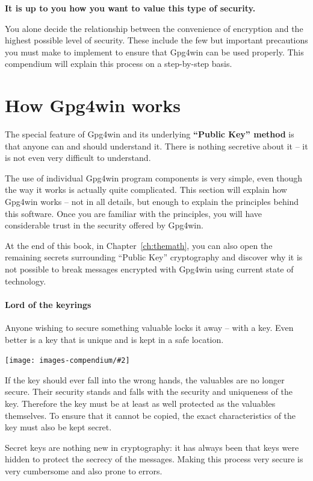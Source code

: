 \documentclass[a4paper,11pt,oneside,openright,titlepage]{scrbook}
\newcommand{\IncludeImage}[2][]{
\begin{center}
  \texttt{[image: images-compendium/\#2]}%
\end{center}
}
\begin{document}
\textbf{It is up to you how you want to value this type of security.}

You alone decide the relationship between the convenience of encryption
and the highest possible level of security. These include the few but
important precautions you must make to implement to ensure that
Gpg4win can be used properly. This compendium will explain this
process on a step-by-step basis.


\clearpage
\chapter{How Gpg4win works}
\label{ch:FunctionOfGpg4win}
The special feature of Gpg4win and its underlying
\textbf{``Public Key'' method}
is that anyone can and should understand it. There is nothing
secretive about it -- it is not even very difficult to understand.

The use of individual Gpg4win program components is very simple, even
though the way it works is actually quite complicated. This section
will explain how Gpg4win works -- not in all details, but enough to
explain the principles behind this software. Once you are familiar
with the principles, you will have considerable trust in the security
offered by Gpg4win.

At the end of this book, in Chapter~\ref{ch:themath}, you can also open
the remaining secrets surrounding ``Public Key'' cryptography and
discover why it is not possible to break messages encrypted with
Gpg4win using current state of technology.

\clearpage
\subsubsection{Lord of the keyrings}
Anyone wishing to secure something valuable locks it away -- with a
key. Even better is a key that is unique and is kept in a safe
location.

\IncludeImage[width=0.5\textwidth]{schlapphut-with-key}

If the key should ever fall into the wrong hands, the valuables are no
longer secure. Their security stands and falls with the security and
uniqueness of the key. Therefore the key must be at least as well
protected as the valuables themselves. To ensure that it cannot be
copied, the exact characteristics of the key must also be kept secret.

\clearpage
Secret keys are nothing new in cryptography: it has always been that
keys were hidden to protect the secrecy of the messages. Making this
process very secure is very cumbersome and also prone to errors.
\end{document}
